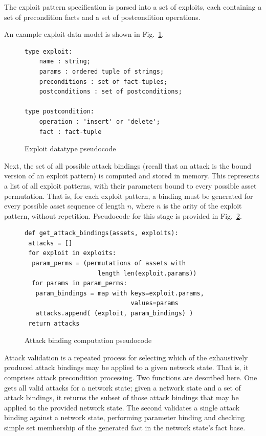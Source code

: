 The exploit pattern specification is parsed into a set of exploits, each
containing a set of precondition facts and a set of postcondition operations.

An example exploit data model is shown in
Fig.~\ref{fig:exploit_pc}.

\begin{figure}
\begin{lstlisting}
type exploit:
    name : string;
    params : ordered tuple of strings;
    preconditions : set of fact-tuples;
    postconditions : set of postconditions;
    
type postcondition:
    operation : 'insert' or 'delete';
    fact : fact-tuple
\end{lstlisting}
\caption{Exploit datatype pseudocode}
\label{fig:exploit_pc}
\end{figure}

Next, the set of all possible attack bindings (recall that an attack is the
bound version of an exploit pattern) is computed and stored in memory. This
represents a list of all exploit patterns, with their parameters bound to
every possible asset permutation. That is, for each exploit pattern, a
binding must be generated for every possible asset sequence of length $n$,
where $n$ is the arity of the exploit pattern, without repetition. Pseudocode
for this stage is provided in Fig.~\ref{fig:binding_computation_pc}.

\begin{figure}
\begin{lstlisting}
def get_attack_bindings(assets, exploits): 
 attacks = [] 
 for exploit in exploits:
  param_perms = (permutations of assets with 
                    length len(exploit.params))
  for params in param_perms:
   param_bindings = map with keys=exploit.params,
                             values=params
   attacks.append( (exploit, param_bindings) )
 return attacks
\end{lstlisting}
\caption{Attack binding computation pseudocode}
\label{fig:binding_computation_pc}
\end{figure}

Attack validation is a repeated process for selecting which of the exhaustively
produced attack bindings may be applied to a given network state. That is,
it comprises attack precondition processing. Two functions are described here.
One gets all valid attacks for a network state; given a network state
and a set of attack bindings, it returns the subset of those attack bindings
that may be applied to the provided network state. The second validates a
single attack binding against a network state, performing parameter binding and
checking simple set membership of the generated fact in the network state's
fact base.

